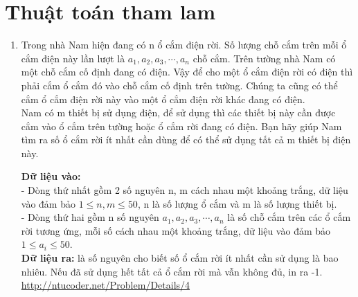 \documentclass[12pt,a4paper]{article}
\begin{document}
\section{Thuật toán tham lam}
\begin{enumerate}
	\item 
	  Trong nhà Nam hiện đang có n ổ cắm điện rời. Số lượng chỗ cắm trên mỗi ổ cắm điện này lần lượt là $a_1, a_2, a_3,\cdots,a_n$  chỗ cắm. Trên tường nhà Nam có một chỗ cắm cố định đang có điện. Vậy để cho một ổ cắm điện rời có điện thì phải cắm ổ cắm đó vào chỗ cắm cố định trên tường. Chúng ta cũng có thể cắm ổ cắm điện rời này vào một ổ cắm điện rời khác đang có điện.\\
      Nam có m thiết bị sử dụng điện, để sử dụng thì các thiết bị này cần được cắm vào ổ cắm trên tường hoặc ổ cắm rời đang có điện. Bạn hãy giúp Nam tìm ra số ổ cắm rời ít nhất cần dùng để có thể sử dụng tất cả m thiết bị điện này.

\textbf{Dữ liệu vào:} \\
      - Dòng thứ nhất gồm 2 số nguyên n, m cách nhau một khoảng trắng, dữ liệu vào đảm bảo $1\leq n,m \leq 50$, n là số lượng ổ cắm và m là số lượng thiết bị.\\
      - Dòng thứ hai gồm n số nguyên $a_1, a_2, a_3,\cdots,a_n$ là số chỗ cắm trên các ổ cắm rời tương ứng, mỗi số cách nhau một khoảng trắng, dữ liệu vào đảm bảo $1 \leq a_i \leq 50$.\\

\textbf{Dữ liệu ra:} là số nguyên cho biết số ổ cắm rời ít nhất cần sử dụng là bao nhiêu. Nếu đã sử dụng hết tất cả ổ cắm rời mà vẫn không đủ, in ra -1. \\
\url{http://ntucoder.net/Problem/Details/4}


\end{enumerate}
\end{document}
